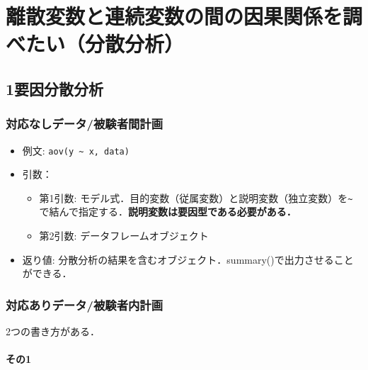 \documentclass[
  xelatex, ja=standard]{bxjsarticle}
\providecommand{\tightlist}{%
  \setlength{\itemsep}{0pt}\setlength{\parskip}{0pt}}
\begin{document}
\section{離散変数と連続変数の間の因果関係を調べたい（分散分析）}\label{ux96e2ux6563ux5909ux6570ux3068ux9023ux7d9aux5909ux6570ux306eux9593ux306eux56e0ux679cux95a2ux4fc2ux3092ux8abfux3079ux305fux3044ux5206ux6563ux5206ux6790}

\subsection{1要因分散分析}\label{ux8981ux56e0ux5206ux6563ux5206ux6790}

\subsubsection{対応なしデータ/被験者間計画}\label{ux5bfeux5fdcux306aux3057ux30c7ux30fcux30bfux88abux9a13ux8005ux9593ux8a08ux753b}

\begin{itemize}
\tightlist
\item
  例文: \texttt{aov(y\ \textasciitilde{}\ x,\ data)}
\item
  引数：

  \begin{itemize}
  \tightlist
  \item
    第1引数:
    モデル式．目的変数（従属変数）と説明変数（独立変数）を\texttt{\textasciitilde{}}で結んで指定する．\textbf{説明変数は要因型である必要がある．}
  \item
    第2引数: データフレームオブジェクト
  \end{itemize}
\item
  返り値:
  分散分析の結果を含むオブジェクト．summary()で出力させることができる．
\end{itemize}

\subsubsection{対応ありデータ/被験者内計画}\label{ux5bfeux5fdcux3042ux308aux30c7ux30fcux30bfux88abux9a13ux8005ux5185ux8a08ux753b}

2つの書き方がある．

\paragraph{その1}\label{ux305dux306e1}
\end{document}
